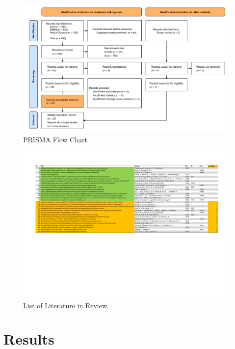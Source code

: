 \documentclass[acmsmall,authorversion]{acmart}
\begin{document}
\begin{figure}[H]
  \centering
  \includegraphics[width=\linewidth]{MetaAnalysis_LLM_Creativity_PRISMA_Flowchart.drawio}
  \caption{PRISMA Flow Chart}
  \label{fig:PRIMSAFlowchart}
\end{figure}

\begin{figure}[H]
  \centering
  \includegraphics[width=\linewidth]{0_DRAFT List included Paper.pdf}
  \caption{List of Literature in Review.}
  \label{fig:TablePapers}
\end{figure}

\newpage


\section{Results}
\label{sec:Results}
\end{document}
